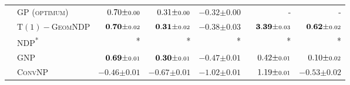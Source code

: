 \begin{table}[b]
\begin{tabular}{llrrrrr}
		\midrule
		\parbox[t]{2mm}{}
		 & \scshape GP (optimum)                                   & \(\hphantom{-}0.70 { \pm \scriptstyle 0.00 }\)                                  & \(\hphantom{-}0.31 { \pm \scriptstyle 0.00 }\)                                  & \(-0.32 { \pm \scriptstyle 0.00 }\)                                  & -                                                                             & -                                                                             \\
		 & \scshape\(\mathrm{T}(1)-\)GeomNDP  &  \(\hphantom{-}\mathbf{0.70} { \pm \scriptstyle 0.02 }\) &  \(\hphantom{-}\mathbf{0.31} { \pm \scriptstyle 0.02 }\) &  \(\mathbf{-0.38} { \pm \scriptstyle 0.03 }\) &  \(\hphantom{-}\mathbf{3.39} { \pm \scriptstyle 0.03 }\) &  \(\hphantom{-}\mathbf{0.62} { \pm \scriptstyle 0.02 }\) \\
		 & \scshape NDP\textsuperscript{*}                         & *                                                                             & *                                                                             & *                                                                  & *                                                                             & *                                                                             \\
		 & \scshape GNP                                            & \(\hphantom{-}\mathbf{0.69} { \pm \scriptstyle 0.01 }\)                         & \(\hphantom{-}\mathbf{0.30} { \pm \scriptstyle 0.01 }\)                         & \(-0.47 { \pm \scriptstyle 0.01 }\)                                  & \(\hphantom{-}0.42 { \pm \scriptstyle 0.01 }\)                                  & \(\hphantom{-}0.10 { \pm \scriptstyle 0.02 }\)                                  \\
		 & \scshape ConvNP                                         & \(-0.46 { \pm \scriptstyle 0.01 }\)                                             & \(-0.67 { \pm \scriptstyle 0.01 }\)                                             & \(-1.02 { \pm \scriptstyle 0.01 }\)                                  & \(\hphantom{-}1.19 { \pm \scriptstyle 0.01 }\)                                  & \(-0.53 { \pm \scriptstyle 0.02 }\)                                             \\

		\bottomrule
	\end{tabular}
\end{table}
